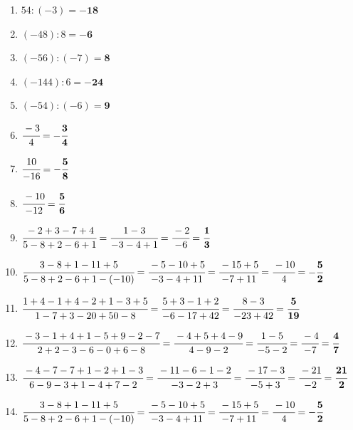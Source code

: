\documentclass[a4paper,12pt]{article} %
\begin{document}
\begin{enumerate}

  \item \(54 \colon (-3) = \mathbf{-18}\) %

  \item \((-48) \colon 8 = \mathbf{-6}\) %

  \item \((-56) \colon (-7) = \mathbf{8}\) %

  \item \((-144) \colon 6 = \mathbf{-24}\) %

  \item \((-54) \colon (-6) = \mathbf{9}\) %

  \item \(\cfrac{-3}{4} = \mathbf{-\cfrac{3}{4}}\) %

  \item \(\cfrac{10}{-16} = \mathbf{-\cfrac{5}{8}}\) %

  \item \(\cfrac{-10}{-12} = \mathbf{\cfrac{5}{6}}\) %

  \item \(\cfrac{-2 + 3 - 7 + 4}{5 - 8 + 2 - 6 + 1} = \cfrac{1 - 3}{-3 - 4 + 1} =
    \cfrac{-2}{-6} = \mathbf{\cfrac{1}{3}}\) %

  \item \(\cfrac{3 - 8 + 1 - 11 + 5}{5 - 8 + 2 - 6 + 1 - (-10)} = \cfrac{-5 - 10 + 5}{-3 - 4 + 11} =
    \cfrac{-15 + 5}{-7 + 11} = \cfrac{-10}{4} = \mathbf{-\cfrac{5}{2}}\) %

  \item \(\cfrac{1 + 4 - 1 + 4 - 2 + 1 - 3 + 5}{1 - 7 + 3 - 20 + 50 - 8} =
    \cfrac{5 + 3 - 1 + 2}{-6 - 17 + 42} = \cfrac{8 - 3}{-23 + 42} = \mathbf{\cfrac{5}{19}}\) %

  \item \(\cfrac{-3 - 1 + 4 + 1 - 5 + 9 - 2 - 7}{2 + 2 - 3 - 6 - 0 + 6 - 8} =
    \cfrac{-4 + 5 + 4 - 9}{4 - 9 - 2} = \cfrac{1 - 5}{-5 - 2} = \cfrac{-4}{-7} = \mathbf{\cfrac{4}{7}}\) %

  \item \(\cfrac{-4 - 7 - 7 + 1 - 2 + 1 - 3}{6 - 9 - 3 + 1 - 4 + 7 - 2} =
    \cfrac{-11 - 6 - 1 - 2}{-3 - 2 + 3} = \cfrac{-17 - 3}{-5 + 3} = \cfrac{-21}{-2} = \mathbf{\cfrac{21}{2}}\) %

  \item \(\cfrac{3 - 8 + 1 - 11 + 5}{5 - 8 + 2 - 6 + 1 - (-10)} = \cfrac{-5 - 10 + 5}{-3 - 4 + 11} =
    \cfrac{-15 + 5}{-7 + 11} = \cfrac{-10}{4} = \mathbf{-\cfrac{5}{2}}\) %


\end{enumerate}
\end{document}
